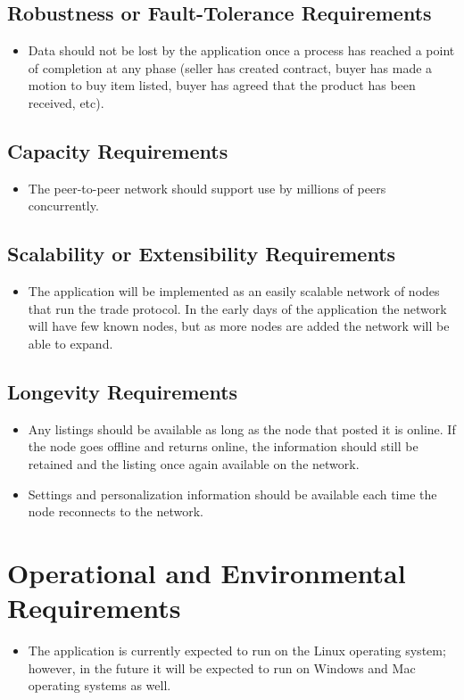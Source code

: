\documentclass{article}
\begin{document}
\subsection{Robustness or Fault-Tolerance Requirements}
\begin{itemize}
\item
Data should not be lost by the application once a process has reached a point of completion at any phase (seller has created contract, buyer has made a motion to buy item listed, buyer has agreed that the product has been received, etc).  
\end{itemize}
\subsection{Capacity Requirements}
\begin{itemize}
        \item 
        The peer-to-peer network should support use by millions of peers concurrently. 
\end{itemize}
\subsection{Scalability or Extensibility Requirements}
\begin{itemize}
\item 
The application will be implemented as an easily scalable network of nodes that run the trade protocol. In the early days of the application the network will have few known nodes, but as more nodes are added the network will be able to expand. 
\end{itemize}
\subsection{Longevity Requirements}
\begin{itemize}
        \item 
        Any listings should be available as long as the node that posted it is online. If the node goes offline and returns online, the information should still be retained and the listing once again available on the network.
        \item
        Settings and personalization information should be available each time the node reconnects to the network.
\end{itemize}
\section{Operational and Environmental Requirements}
\begin{itemize}
        \item 
    The application is currently expected to run on the Linux operating system; however, in the future it will be expected to run on Windows and Mac operating systems as well.
\end{itemize}
\end{document}
